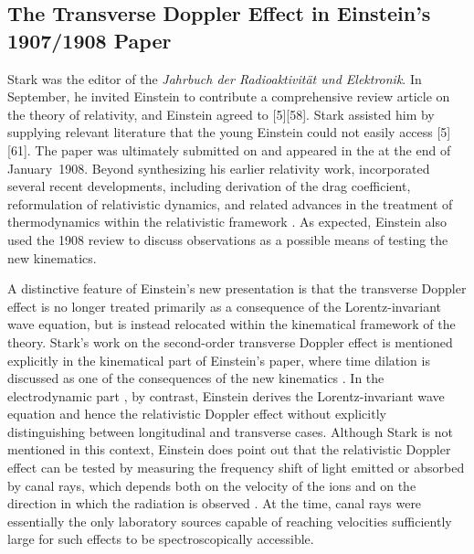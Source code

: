 \documentclass[submitted,12pt]{article}
\newcommand{\TDE}{Transverse Doppler Effect\xspace}
\begin{document}
\subsection{The \TDE{} in Einstein’s 1907/1908  Paper}
%
Stark was the editor of the \emph{Jahrbuch der Radioaktivität und Elektronik}. In September, he invited Einstein to contribute a comprehensive review article on the theory of relativity, and Einstein agreed to  [5][58]. Stark assisted him by supplying relevant literature that the young Einstein could not easily access [5][61]. The paper was ultimately submitted on  and appeared in the  at the end of January~1908. Beyond synthesizing his earlier relativity work, \citet{Einstein1908} incorporated several recent developments, including  derivation of the drag coefficient,  reformulation of relativistic dynamics, and related advances in the treatment of thermodynamics within the relativistic framework \citep{Planck1907}. As expected, Einstein also used the 1908 review to discuss  observations as a possible means of testing the new kinematics.

A distinctive feature of Einstein’s new presentation is that the transverse Doppler effect is no longer treated primarily as a consequence of the Lorentz-invariant wave equation, but is instead relocated within the kinematical framework of the theory. Stark’s work on the second-order transverse Doppler effect is mentioned explicitly in the kinematical part  of Einstein’s paper, where time dilation is discussed as one of the consequences of the new kinematics \citep[422]{Einstein1908}. In the electrodynamic part , by contrast, Einstein derives the Lorentz-invariant wave equation and hence the relativistic Doppler effect without explicitly distinguishing between longitudinal and transverse cases. Although Stark is not mentioned in this context, Einstein does point out that the relativistic Doppler effect can be tested by measuring the frequency shift of light emitted or absorbed by canal rays, which depends both on the velocity of the ions and on the direction in which the radiation is observed \citep[425]{Einstein1907a}. At the time, canal rays were essentially the only laboratory sources capable of reaching velocities sufficiently large for such effects to be spectroscopically accessible.

\end{document}
